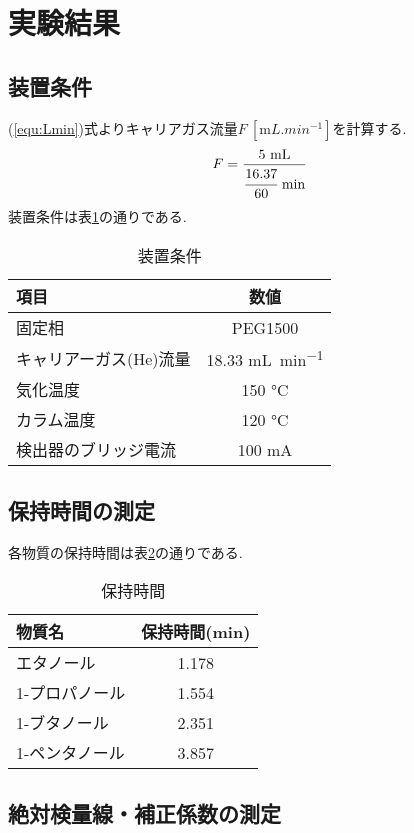 \section{実験結果}
\subsection{装置条件}
(\ref{equ:Lmin})式よりキャリアガス流量$F\ [\si{\milli L.min^{-1}}]$を計算する.
\begin{equation}
  \label{equ:Lmin}
  F=\frac{5\ \si{\milli L}}{\cfrac{16.37}{60}\ \si{min}}
\end{equation}
装置条件は表\ref{tab:condition}の通りである.
\begin{table}[h]
  \caption{装置条件}
  \label{tab:condition}
  \centering
  \begin{tabular}{lc}
    \hline
    項目 & 数値 \\
    \hline \hline
    固定相 & PEG1500 \\
    キャリアーガス(He)流量 & 18.33 \si{\milli L.min^{-1}} \\
    気化温度 & 150 \si{\degreeCelsius} \\
    カラム温度 & 120 \si{\degreeCelsius} \\
    検出器のブリッジ電流 & 100 \si{\milli\ampere} \\
    \hline
  \end{tabular}
\end{table}
\subsection{保持時間の測定}
各物質の保持時間は表\ref{tab:time}の通りである.
\begin{table}[h]
   \caption{保持時間}
   \label{tab:time}
   \centering
   \begin{tabular}{lc}
     \hline
     物質名 & 保持時間(\si{min}) \\
     \hline \hline
     エタノール & 1.178 \\
     1-プロパノール & 1.554 \\
     1-ブタノール & 2.351 \\
     1-ペンタノール & 3.857 \\
     \hline
   \end{tabular}
\end{table}
\subsection{絶対検量線・補正係数の測定}
